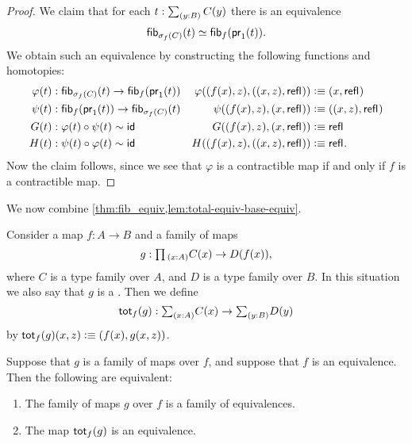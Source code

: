 \begin{proof}
  We claim that for each $t:\sm{y:B}C(y)$ there is an equivalence
  \begin{equation*}
    \fib{\sigma_f(C)}{t}\simeq \fib{f}{\proj 1(t)}.
  \end{equation*}
  We obtain such an equivalence by constructing the following functions and homotopies:
  \begin{align*}
    \varphi(t) & : \fib{\sigma_f(C)}{t}\to\fib{f}{\proj 1 (t)} & \varphi((f(x),z),((x,z),\refl{})) & \defeq (x,\refl{}) \\
    \psi(t) & : \fib{f}{\proj 1(t)} \to\fib{\sigma_f(C)}{t} & \psi((f(x),z),(x,\refl{})) & \defeq ((x,z),\refl{}) \\
    G(t) & : \varphi(t)\circ\psi(t)\htpy\idfunc & G((f(x),z),(x,\refl{})) & \defeq \refl{} \\
    H(t) & : \psi(t)\circ\varphi(t)\htpy\idfunc & H((f(x),z),((x,z),\refl{})) & \defeq \refl{}.
  \end{align*}
  Now the claim follows, since we see that $\varphi$ is a contractible map if and only if $f$ is a contractible map.
\end{proof}

We now combine \cref{thm:fib_equiv,lem:total-equiv-base-equiv}.

\begin{defn}
  Consider a map $f:A\to B$ and a family of maps
  \begin{equation*}
    g:\prd{x:A}C(x)\to D(f(x)),
  \end{equation*}
  where $C$ is a type family over $A$, and $D$ is a type family over $B$. In this situation we also say that $g$ is a . Then we define
  \begin{equation*}
    \tot[f]{g}:\sm{x:A}C(x)\to\sm{y:B}D(y)
  \end{equation*}
  by $\tot[f]{g}(x,z)\defeq (f(x),g(x,z))$.
\end{defn}

\begin{thm}\label{thm:equiv-toto}
  Suppose that $g$ is a family of maps over $f$, and suppose that $f$ is an equivalence. Then the following are equivalent:
  \begin{enumerate}
  \item The family of maps $g$ over $f$ is a family of equivalences.
  \item The map $\tot[f]{g}$ is an equivalence.
  \end{enumerate}
\end{thm}

